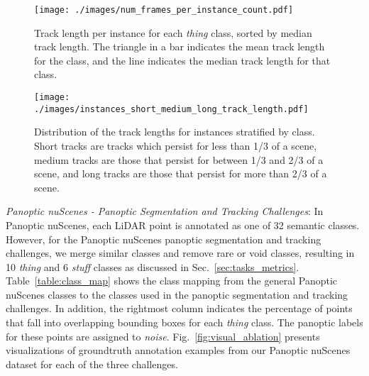 \documentclass[letterpaper, 10 pt, journal, twoside]{IEEEtran}
\newcommand{\tableref}[1]{Table~\ref{#1}}
\newcommand{\secref}[1]{Sec.~\ref{#1}}
\newcommand{\figref}[1]{Fig.~\ref{#1}}
\begin{document}
\begin{figure}
\centering
\texttt{[image: ./images/num\_frames\_per\_instance\_count.pdf]}
\caption{Track length per instance for each \emph{thing} class, sorted by median track length. The triangle in a bar indicates the mean track length for the class, and the line indicates the median track length for that class.}
\label{fig:num_frames_per_instance_count}
\end{figure}

\begin{figure}
\centering
\texttt{[image: ./images/instances\_short\_medium\_long\_track\_length.pdf]}
\caption{Distribution of the track lengths for instances stratified by class. Short tracks are tracks which persist for less than 1/3 of a scene, medium tracks are those that persist for between 1/3 and 2/3 of a scene, and long tracks are those that persist for more than 2/3 of a scene.}
\label{fig:instances_short_medium_long_track_length}
\end{figure}

\noindent\textit{Panoptic nuScenes - Panoptic Segmentation and Tracking Challenges}: In Panoptic nuScenes, each LiDAR point is annotated as one of 32 semantic classes. However, for the Panoptic nuScenes panoptic segmentation and tracking challenges, we merge similar classes and remove rare or void classes, resulting in 10 \emph{thing} and 6 \emph{stuff} classes as discussed in \secref{sec:tasks_metrics}. \tableref{table:class_map} shows the class mapping from the general Panoptic nuScenes classes to the classes used in the panoptic segmentation and tracking challenges.
In addition, the rightmost column indicates the percentage of points that fall into overlapping bounding boxes for each \emph{thing} class. The panoptic labels for these points are assigned to \emph{noise}. \figref{fig:visual_ablation} presents visualizations of groundtruth annotation examples from our Panoptic nuScenes dataset for each of the three challenges. 
\end{document}

